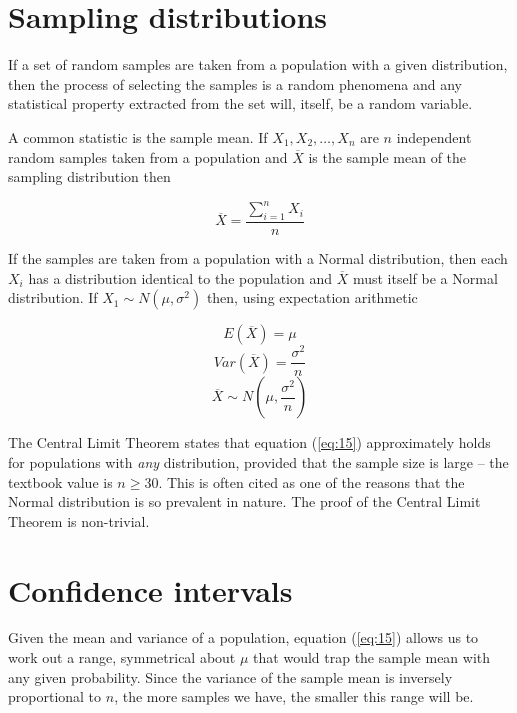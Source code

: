 \documentclass[a5paper]{article}
\begin{document}
\section{Sampling distributions}

If a set of random samples are taken from a population with a given
distribution, then the process of selecting the samples is a random phenomena
and any statistical property extracted from the set will, itself, be a random
variable.

A common statistic is the sample mean. If $X_1, X_2, \ldots, X_n$ are $n$
independent random samples taken from a population and $\overline{X}$ is the
sample mean of the sampling distribution then

\begin{equation}
  \overline{X} = \frac{\sum_{i=1}^{n}X_i}{n}
\end{equation}

If the samples are taken from a population with a Normal distribution, then each
$X_i$ has a distribution identical to the population and $\overline{X}$ must
itself be a Normal distribution. If $X_1\sim N(\mu,\sigma^2)$ then, using
expectation arithmetic

\begin{equation}
  E(\overline{X}) = \mu
\end{equation}
\begin{equation}
  Var(\overline{X}) = \frac{\sigma^2}{n}
\end{equation}
\begin{equation}\label{eq:15}
  \overline{X}\sim N\left(\mu, \frac{\sigma^2}{n}\right)
\end{equation}

The Central Limit Theorem states that equation (\ref{eq:15}) approximately holds
for populations with \textit{any} distribution, provided that the sample size is
large -- the textbook value is $n\ge 30$. This is often cited as one of the
reasons that the Normal distribution is so prevalent in nature. The proof of the
Central Limit Theorem is non-trivial.

\section{Confidence intervals}

Given the mean and variance of a population, equation (\ref{eq:15}) allows us to
work out a range, symmetrical about $\mu$ that would trap the sample mean with
any given probability. Since the variance of the sample mean is inversely
proportional to $n$, the more samples we have, the smaller this range will be.
\end{document}

